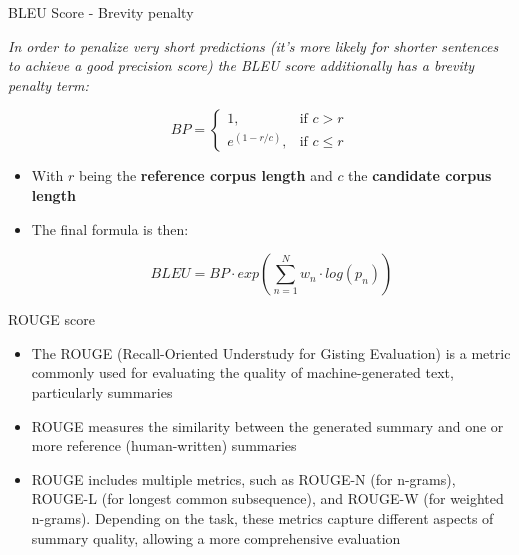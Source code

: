 \documentclass[11pt,compress,t,notes=noshow, xcolor=table]{beamer}
\begin{document}
\begin{vbframe}{BLEU Score - Brevity penalty}

\textit{In order to penalize very short predictions (it's more likely for shorter sentences to achieve a good precision score) the BLEU score additionally has a brevity penalty term:}

$$
  BP=\begin{cases}
    1, & \text{if $c>r$}\\
    e^{(1-r/c)}, & \text{if $c\leq r$}
  \end{cases}
$$

\begin{itemize}
    \item With $r$ being the \textbf{reference corpus length} and $c$ the \textbf{candidate corpus length}
    \item The final formula is then:

$$BLEU = BP \cdot exp\left(\sum_{n=1}^{N}w_n\cdot log(p_n)\right)$$
\end{itemize}
    
\end{vbframe}



\begin{vbframe}{ROUGE score}

\vfill

\begin{itemize}
    \item The ROUGE (Recall-Oriented Understudy for Gisting Evaluation) is a metric commonly used for evaluating the quality of machine-generated text, particularly summaries
    \item ROUGE measures the similarity between the generated summary and one or more reference (human-written) summaries
    \item ROUGE includes multiple metrics, such as ROUGE-N (for n-grams), ROUGE-L (for longest common subsequence), and ROUGE-W (for weighted n-grams). Depending on the task, these metrics capture different aspects of summary quality, allowing a more comprehensive evaluation
\end{itemize}

\vfill
    
\end{vbframe}



\end{document}
